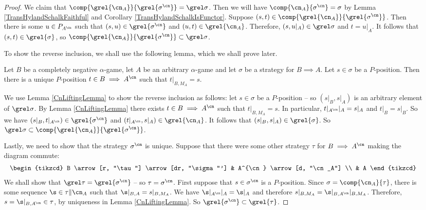 \documentclass[11pt]{article} %
\begin{document}
\begin{proof}
  We claim that $\comp{\grel{\cn_A}}{\grel{\sigma^{\cn}}}=\grel\sigma$.  Then we will have $\comp{\cn_A}{\sigma^{\cn}}=\sigma$ by Lemma \ref{TransHylandSchalkFaithful} and Corollary \ref{TransHylandSchalkIsFunctor}.  Suppose $(s,t)\in\comp{\grel{\cn_A}}{\grel{\sigma^{\cn}}}$.  Then there is some $u\in P_{A^{\cn}}$ such that $(s,u)\in\grel{\sigma^{\cn}}$ and $(u,t)\in\grel{\cn_A}$.  Therefore, $(s,u\vert_A)\in\grel\sigma$ and $t=u\vert_A$.  It follows that $(s,t)\in\grel{\sigma}$, so $\comp{\grel{\cn_A}}{\grel{\sigma^{\cn}}}\subset\grel\sigma$.  

  To show the reverse inclusion, we shall use the following lemma, which we shall prove later.  

  \begin{lemma}
    \label{CnLiftingLemma}
    Let $B$ be a completely negative $\alpha$-game, let $A$ be an arbitrary $\alpha$-game and let $\sigma$ be a strategy for $B\implies A$.  Let $s\in\sigma$ be a $P$-position.  Then there is a unique $P$-position $t\in B\implies A^{\cn}$ such that $t\vert_{B,M_A}=s$.
  \end{lemma}

  We use Lemma \ref{CnLiftingLemma} to show the reverse inclusion as follows: let $s\in\sigma$ be a $P$-position -- so $(s\vert_B,s\vert_A)$ is an arbitrary element of $\grel\sigma$.  By Lemma \ref{CnLiftingLemma} there exists $t\in B\implies A^{\cn}$ such that $t\vert_{B,M_A}=s$.  In particular, $t\vert_{A^{\cn}}\vert_A=s\vert_A$ and $t\vert_B=s\vert_B$.  So we have $(s\vert_B,t\vert_{A^{\cn}})\in\grel{\sigma^{\cn}}$ and $(t\vert_{A^{\cn}},s\vert_A)\in\grel{\cn_A}$.  It follows that $(s\vert_B,s\vert_A)\in\grel{\sigma}$.  So $\grel\sigma\subset\comp{\grel{\cn_A}}{\grel{\sigma^{\cn}}}$.  

  Lastly, we need to show that the strategy $\sigma^{\cn}$ is unique.  Suppose that there were some other strategy $\tau$ for $B\implies A^{\cn}$ making the diagram commute:
  \[
    \begin{tikzcd}
      B \arrow[r, "\tau"] \arrow[dr, "\sigma"']
        & A^{\cn} \arrow[d, "\cn_A"] \\
        & A
    \end{tikzcd}
    \]
  We shall show that $\grel\tau=\grel{\sigma^{\cn}}$ -- so $\tau=\sigma^{\cn}$.  First suppose that $s\in\sigma^{\cn}$ is a $P$-position.  Since $\sigma = \comp{\cn_A}{\tau}$, there is some sequence $\s\in\tau\|\cn_A$ such that $\s\vert_{B,A}=s\vert_{B,M_A}$.  We have $\s\vert_{A^{\cn}}\vert_A=\s\vert_A$ and therefore $s\vert_{B,M_A}=\s\vert_{B,A^{\cn}}\vert_{B,M_A}$.  Therefore, $s=\s\vert_{B,A^{\cn}}\in\tau$, by uniqueness in Lemma \ref{CnLiftingLemma}.  So $\grel{\sigma^{\cn}}\subset\grel{\tau}$.  


\end{proof}
\end{document}
